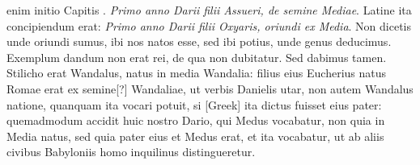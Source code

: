 enim initio Capitis .
\textit{Primo anno Darii filii Assueri, de semine
Mediae}.
Latine ita concipiendum erat: \textit{Primo anno Darii filii Oxyaris,
oriundi ex Media}.
Non dicetis unde oriundi sumus, ibi nos natos
esse, sed ibi potius, unde genus deducimus.
Exemplum dandum
non erat rei, de qua non dubitatur.
Sed dabimus tamen.
Stilicho
erat Wandalus, natus in media Wandalia: filius eius Eucherius natus
Romae erat ex semine[?] Wandaliae, ut verbis Danielis utar, non autem
Wandalus natione, quanquam ita vocari potuit, si \textgreek{[Greek]}
ita dictus fuisset eius pater: quemadmodum accidit huic nostro
Dario, qui Medus vocabatur, non quia in Media natus, sed
quia pater eius et Medus erat, et ita vocabatur, ut ab aliis civibus
Babyloniis homo inquilinus distingueretur.

